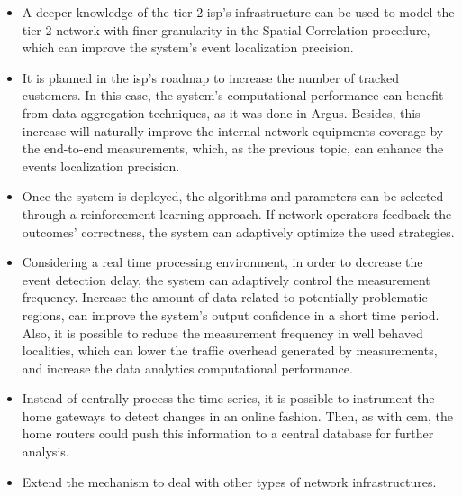 \begin{itemize}
\item
A deeper knowledge of the tier-2 \gls*{isp}'s infrastructure
can be used to model the tier-2 network with finer granularity in the Spatial
Correlation procedure, which can improve the system's event localization
precision.

\item
It is planned in the \gls*{isp}'s roadmap to increase the number of tracked customers.
In this case, the system's computational performance can benefit from data
aggregation techniques, as it was done in Argus.
Besides, this increase will naturally improve the internal network equipments
coverage by the end-to-end measurements, which, as the previous topic, can
enhance the events localization precision.

\item
Once the system is deployed, the algorithms and parameters can be selected
through a reinforcement learning approach. If network operators
feedback the outcomes' correctness, the system can adaptively optimize the used
strategies.

\item
Considering a real time processing environment, in order to decrease the
event detection delay, the system can adaptively control the measurement
frequency.
Increase the amount of data related to potentially problematic regions,
can improve the system's output confidence in a short time period.
Also, it is possible to reduce the measurement frequency in well behaved
localities, which can lower the traffic overhead generated by measurements, and
increase the data analytics computational performance.

\item
Instead of centrally process the time series,
it is possible to instrument the home
gateways to detect changes in an online fashion. Then, as with \gls*{cem}, the home
routers could push this information to a central database for further analysis.

\item
Extend the mechanism to deal with other types of network infrastructures.

\end{itemize}
